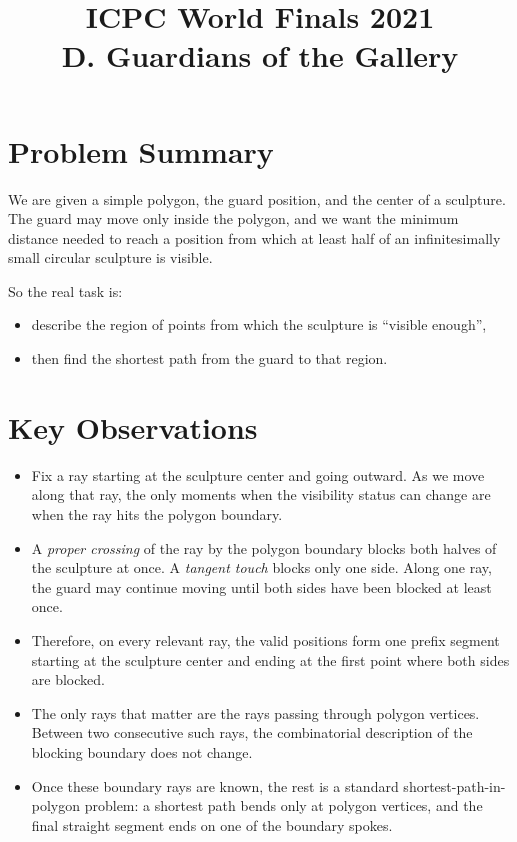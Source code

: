 \documentclass[11pt]{article}
\title{ICPC World Finals 2021\\D. Guardians of the Gallery}
\author{}
\date{}
\begin{document}
\maketitle

\section*{Problem Summary}

We are given a simple polygon, the guard position, and the center of a sculpture. The guard may move
only inside the polygon, and we want the minimum distance needed to reach a position from which at
least half of an infinitesimally small circular sculpture is visible.

So the real task is:
\begin{itemize}[leftmargin=*]
    \item describe the region of points from which the sculpture is ``visible enough'',
    \item then find the shortest path from the guard to that region.
\end{itemize}

\section*{Key Observations}

\begin{itemize}[leftmargin=*]
    \item Fix a ray starting at the sculpture center and going outward. As we move along that ray, the
    only moments when the visibility status can change are when the ray hits the polygon boundary.

    \item A \emph{proper crossing} of the ray by the polygon boundary blocks both halves of the sculpture
    at once. A \emph{tangent touch} blocks only one side. Along one ray, the guard may continue moving
    until both sides have been blocked at least once.

    \item Therefore, on every relevant ray, the valid positions form one prefix segment starting at the
    sculpture center and ending at the first point where both sides are blocked.

    \item The only rays that matter are the rays passing through polygon vertices. Between two consecutive
    such rays, the combinatorial description of the blocking boundary does not change.

    \item Once these boundary rays are known, the rest is a standard shortest-path-in-polygon problem:
    a shortest path bends only at polygon vertices, and the final straight segment ends on one of the
    boundary spokes.
\end{itemize}
\end{document}
